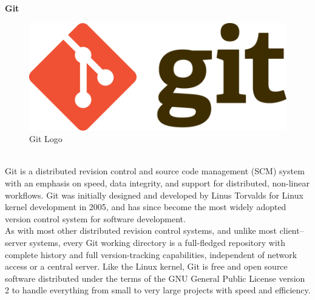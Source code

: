 \noindent\textbf{Git}
\begin{figure}[h]
	\centering\includegraphics[scale=0.30]{images/git_logo.png}
	\caption{Git Logo}
\end{figure}\\Git is a distributed revision control and source code management (SCM) system with an emphasis on speed, data integrity, and support for distributed, non-linear workflows. Git was initially designed and developed by Linus Torvalds for Linux kernel development in 2005, and has since become the most widely adopted version control system for software development.\\

As with most other distributed revision control systems, and unlike most client–server systems, every Git working directory is a full-fledged repository with complete history and full version-tracking capabilities, independent of network access or a central server. Like the Linux kernel, Git is free and open source software distributed under the terms of the GNU General Public License version 2 to handle everything from small to very large projects with speed and efficiency.

